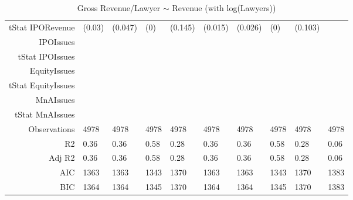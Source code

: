 \begin{table}[ht]
\begin{tabular}{rlllllllll}
  tStat IPORevenue & (0.03) & (0.047) & (0) & (0.145) & (0.015) & (0.026) & (0) & (0.103) &  \\ 
  IPOIssues &  &  &  &  &  &  &  &  &  \\ 
  tStat IPOIssues &  &  &  &  &  &  &  &  &  \\ 
  EquityIssues &  &  &  &  &  &  &  &  &  \\ 
  tStat EquityIssues &  &  &  &  &  &  &  &  &  \\ 
  MnAIssues &  &  &  &  &  &  &  &  &  \\ 
  tStat MnAIssues &  &  &  &  &  &  &  &  &  \\ 
  Observations & 4978 & 4978 & 4978 & 4978 & 4978 & 4978 & 4978 & 4978 & 4978 \\ 
  R2 & 0.36 & 0.36 & 0.58 & 0.28 & 0.36 & 0.36 & 0.58 & 0.28 & 0.06 \\ 
  Adj R2 & 0.36 & 0.36 & 0.58 & 0.28 & 0.36 & 0.36 & 0.58 & 0.28 & 0.06 \\ 
  AIC & 1363 & 1363 & 1343 & 1370 & 1363 & 1363 & 1343 & 1370 & 1383 \\ 
  BIC & 1364 & 1364 & 1345 & 1370 & 1364 & 1364 & 1345 & 1370 & 1383 \\ 
   \hline
\end{tabular}
\caption{Gross Revenue/Lawyer $\sim$ Revenue (with log(Lawyers))} 
\end{table}

